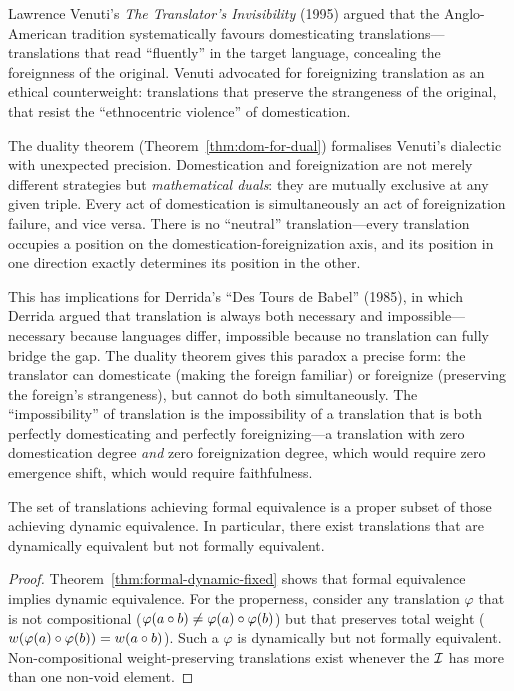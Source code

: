 \begin{interpretation}
\label{interp:venuti-ethics}
Lawrence Venuti's \textit{The Translator's Invisibility} (1995) argued that the Anglo-American tradition systematically favours domesticating translations---translations that read ``fluently'' in the target language, concealing the foreignness of the original.  Venuti advocated for foreignizing translation as an ethical counterweight: translations that preserve the strangeness of the original, that resist the ``ethnocentric violence'' of domestication.

The duality theorem (Theorem~\ref{thm:dom-for-dual}) formalises Venuti's dialectic with unexpected precision.  Domestication and foreignization are not merely different strategies but \emph{mathematical duals}: they are mutually exclusive at any given triple.  Every act of domestication is simultaneously an act of foreignization failure, and vice versa.  There is no ``neutral'' translation---every translation occupies a position on the domestication-foreignization axis, and its position in one direction exactly determines its position in the other.

This has implications for Derrida's ``Des Tours de Babel'' (1985), in which Derrida argued that translation is always both necessary and impossible---necessary because languages differ, impossible because no translation can fully bridge the gap.  The duality theorem gives this paradox a precise form: the translator can domesticate (making the foreign familiar) or foreignize (preserving the foreign's strangeness), but cannot do both simultaneously.  The ``impossibility'' of translation is the impossibility of a translation that is both perfectly domesticating and perfectly foreignizing---a translation with zero domestication degree \emph{and} zero foreignization degree, which would require zero emergence shift, which would require faithfulness.
\end{interpretation}

\begin{theorem}
\label{thm:nida-hierarchy}
The set of translations achieving formal equivalence is a proper subset of those achieving dynamic equivalence.  In particular, there exist translations that are dynamically equivalent but not formally equivalent.
\end{theorem}

\begin{proof}
Theorem~\ref{thm:formal-dynamic-fixed} shows that formal equivalence implies dynamic equivalence.  For the properness, consider any translation $\varphi$ that is not compositional ($\varphi(a \circ b) \neq \varphi(a) \circ \varphi(b)$) but that preserves total weight ($w(\varphi(a) \circ \varphi(b)) = w(a \circ b)$).  Such a $\varphi$ is dynamically but not formally equivalent.  Non-compositional weight-preserving translations exist whenever the $\mathcal{I}$ has more than one non-void element.
\end{proof}

